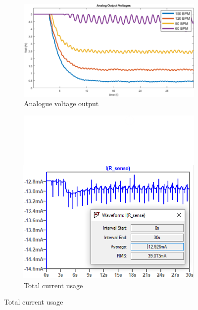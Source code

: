 \begin{figure}[h]
 \footnotesize
   \centering
   \begin{subfigure}[]{0.55\textwidth}
        \includegraphics[width=\linewidth]{./Figures/analog}
	  \caption{Analogue voltage output} \label{subfig:analog}	
   \end{subfigure}
   \begin{subfigure}[]{0.4\textwidth}
	\vspace{-1.6cm}  	 
  	 \includegraphics[width=\linewidth]{./Figures/current}
  	 \vspace*{0.01mm}
	  \caption{Total current usage} \label{subfig:current}	
   \end{subfigure}
 \end{figure}

